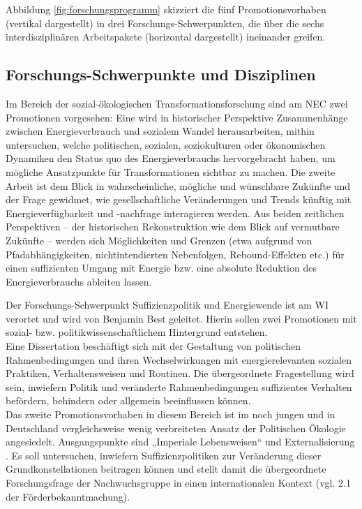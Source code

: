 \documentclass[a4paper,11pt,twoside]{scrartcl}
\begin{document}
Abbildung \ref{fig:forschungsprogramm} skizziert die fünf Promotionsvorhaben (vertikal dargestellt) in drei Forschungs-Schwerpunkten, die über die sechs interdisziplinären Arbeitspakete (horizontal dargestellt) ineinander greifen.

\subsection{Forschungs-Schwerpunkte und Disziplinen}
Im Bereich der sozial-ökologischen Transformationsforschung sind am NEC zwei Promotionen vorgesehen: Eine wird in historischer Perspektive Zusammenhänge zwischen Energieverbrauch und sozialem Wandel herausarbeiten, mithin untersuchen, welche politischen, sozialen, soziokulturen oder ökonomischen Dynamiken den Status quo des Energieverbrauchs hervorgebracht haben, um mögliche Ansatzpunkte für Transformationen sichtbar zu machen. Die zweite Arbeit ist dem Blick in wahrscheinliche, mögliche und wünschbare Zukünfte \cite{Kreibich2008} und der Frage gewidmet, wie gesellschaftliche Veränderungen und Trends künftig mit Energieverfügbarkeit und -nachfrage interagieren werden. Aus beiden zeitlichen Perspektiven – der historischen Rekonstruktion wie dem Blick auf vermutbare Zukünfte – werden sich Möglichkeiten und Grenzen (etwa aufgrund von Pfadabhängigkeiten, nichtintendierten Nebenfolgen, Rebound-Effekten etc.) für einen suffizienten Umgang mit Energie bzw. eine absolute Reduktion des Energieverbrauchs ableiten lassen.

Der Forschungs-Schwerpunkt Suffizienzpolitik und Energiewende ist am WI verortet und wird von Benjamin Best geleitet. Hierin sollen zwei Promotionen mit sozial- bzw. politikwissenschaftlichem Hintergrund entstehen.\\ 
Eine Dissertation beschäftigt sich mit der Gestaltung von politischen Rahmenbedingungen und ihren Wechselwirkungen mit energierelevanten sozialen Praktiken, Verhaltensweisen und Routinen. Die übergeordnete Fragestellung wird sein, inwiefern Politik und veränderte Rahmenbedingungen suffizientes Verhalten befördern, behindern oder allgemein beeinflussen können.\\
Das zweite Promotionsvorhaben in diesem Bereich ist im noch jungen und in Deutschland vergleichsweise wenig verbreiteten Ansatz der Politischen Ökologie angesiedelt. Ausgangspunkte sind „Imperiale Lebensweisen“ \cite{Brand2017} und Externalisierung \cite{Lessenich2016,BieseckerOJ}. Es soll untersuchen, inwiefern Suffizienzpolitiken zur Veränderung dieser Grundkonstellationen beitragen können und stellt damit die übergeordnete Forschungsfrage der Nachwuchsgruppe in einen internationalen Kontext (vgl. 2.1 der Förderbekanntmachung).
\end{document}

